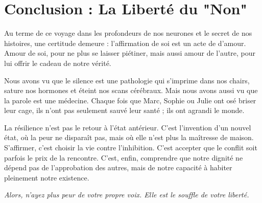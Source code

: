 \chapter*{Conclusion : La Liberté du "Non"}

Au terme de ce voyage dans les profondeurs de nos neurones et le secret de nos histoires, une certitude demeure : l'affirmation de soi est un acte de d'amour. Amour de soi, pour ne plus se laisser piétiner, mais aussi amour de l'autre, pour lui offrir le cadeau de notre vérité.

Nous avons vu que le silence est une pathologie qui s'imprime dans nos chairs, sature nos hormones et éteint nos scans cérébraux. Mais nous avons aussi vu que la parole est une médecine. Chaque fois que Marc, Sophie ou Julie ont osé briser leur cage, ils n'ont pas seulement sauvé leur santé ; ils ont agrandi le monde.

La résilience n'est pas le retour à l'état antérieur. C'est l'invention d'un nouvel état, où la peur ne disparaît pas, mais où elle n'est plus la maîtresse de maison. S'affirmer, c'est choisir la vie contre l'inhibition. C'est accepter que le conflit soit parfois le prix de la rencontre. C'est, enfin, comprendre que notre dignité ne dépend pas de l'approbation des autres, mais de notre capacité à habiter pleinement notre existence.

\textit{Alors, n'ayez plus peur de votre propre voix. Elle est le souffle de votre liberté.}
